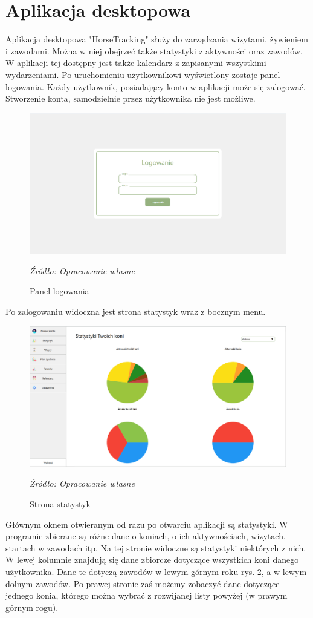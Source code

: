 \documentclass[12pt,oneside]{report}
\begin{document}
\section{Aplikacja desktopowa}
Aplikacja desktopowa "HorseTracking" służy do zarządzania wizytami, żywieniem i zawodami. Można w niej obejrzeć także statystyki z aktywności oraz zawodów. W aplikacji tej dostępny jest także kalendarz z zapisanymi wszystkimi wydarzeniami. Po uruchomieniu użytkownikowi wyświetlony zostaje panel logowania. Każdy użytkownik, posiadający konto w aplikacji może się zalogować. Stworzenie konta, samodzielnie przez użytkownika nie jest możliwe.
\begin{figure}[H]
	\centering
	\includegraphics[scale=0.32]{Logowanie}
	\caption{Panel logowania}
	\textit{Źródło: Opracowanie własne}
	\label{Logowanie}
\end{figure}
Po zalogowaniu widoczna jest strona statystyk wraz z bocznym menu. 
\begin{figure}[H]
\centering
\includegraphics[scale=0.4]{Statystyki}
\caption{Strona statystyk}
\textit{Źródło: Opracowanie własne}
\label{Statystyki}
\end{figure}
Głównym oknem otwieranym od razu po otwarciu aplikacji są statystyki. W programie zbierane są różne dane o koniach, o ich aktywnościach, wizytach, startach w zawodach itp. Na tej stronie widoczne są statystyki niektórych z nich. W lewej kolumnie znajdują się dane zbiorcze dotyczące wszystkich koni danego użytkownika. Dane te dotyczą zawodów w lewym górnym roku rys. \ref{Statystyki}, a w lewym dolnym zawodów. Po prawej stronie zaś możemy zobaczyć dane dotyczące jednego konia, którego można wybrać z rozwijanej listy powyżej (w prawym górnym rogu).
\end{document}
